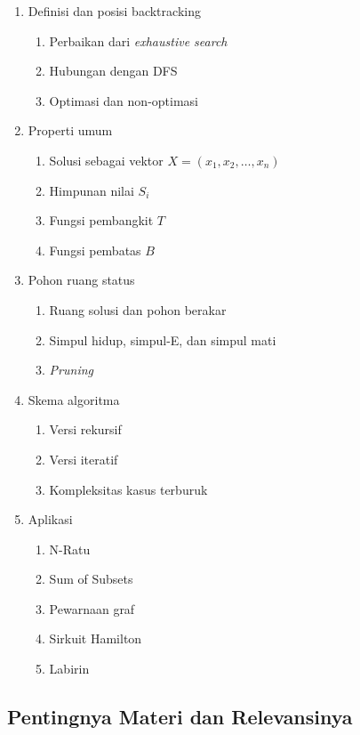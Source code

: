 \begin{enumerate}
    \item Definisi dan posisi backtracking
    \begin{enumerate}
        \item Perbaikan dari \textit{exhaustive search}
        \item Hubungan dengan DFS
        \item Optimasi dan non-optimasi
    \end{enumerate}
    \item Properti umum
    \begin{enumerate}
        \item Solusi sebagai vektor $X=(x_1,x_2,\ldots,x_n)$
        \item Himpunan nilai $S_i$
        \item Fungsi pembangkit $T$
        \item Fungsi pembatas $B$
    \end{enumerate}
    \item Pohon ruang status
    \begin{enumerate}
        \item Ruang solusi dan pohon berakar
        \item Simpul hidup, simpul-E, dan simpul mati
        \item \textit{Pruning}
    \end{enumerate}
    \item Skema algoritma
    \begin{enumerate}
        \item Versi rekursif
        \item Versi iteratif
        \item Kompleksitas kasus terburuk
    \end{enumerate}
    \item Aplikasi
    \begin{enumerate}
        \item N-Ratu
        \item Sum of Subsets
        \item Pewarnaan graf
        \item Sirkuit Hamilton
        \item Labirin
    \end{enumerate}
\end{enumerate}

\subsection{Pentingnya Materi dan Relevansinya}

